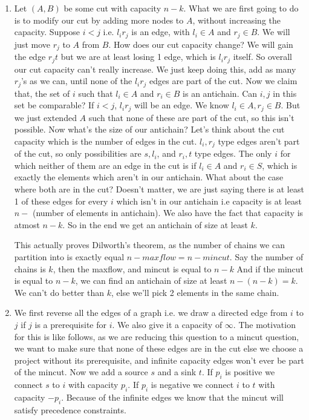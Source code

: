 \documentclass[12pt]{report}
\begin{document}
\begin{enumerate}[label=\textbf{\arabic*.}]
  \item Let $(A,B)$ be some cut with capacity $n-k$. What we are first going to do is to modify our cut by adding more nodes to $A$, without increasing the 
  capacity. Suppose $i < j$ i.e. $l_i r_j$ is an edge, with $l_i \in A$ and $r_j \in B$. We will just move $r_j$ to $A$ from $B$. How does our cut capacity 
  change? We will gain the edge $r_j t$ but we are at least losing 1 edge, which is $l_i r_j$ itself. So overall our cut capacity can't really increase.
  We just keep doing this, add as many $r_j$'s as we can, until none of the $l_i r_j$ edges are part of the cut. Now we claim that, the set of $i$ such that
  $l_i \in A$ and $r_i \in B$ is an antichain. Can $i,j$ in this set be comparable? If $i<j$, $l_i r_j$ will be an edge. 
  We know $l_i \in A, r_j \in B$. But we just extended $A$ such that none of these are part of the cut, so this isn't possible. Now what's the size of our
  antichain? Let's think about the cut capacity which is the number of edges in the cut. $l_i, r_j$ type edges aren't part of the cut, so only possibilities
  are $s, l_i$, and $r_i, t$ type edges. The only $i$ for which neither of them are an edge in the cut is if $l_i \in A$ and $r_i \in S$, which is exactly
  the elements which aren't in our antichain. What about the case where both are in the cut? Doesn't matter, we are just saying there is at least 1 of these 
  edges for every $i$ which isn't in our antichain i.e capacity is at least $n -$ (number of elements in antichain). We also have the fact that capacity is 
  atmost $n-k$. So in the end we get an antichain of size at least $k$.

  This actually proves Dilworth's theorem, as the number of chains we can partition into is exactly equal $n - maxflow = n - mincut$. 
  Say the number of chains is $k$, then the maxflow, and mincut is equal to $n-k$
  And if the mincut is equal to $n-k$, we can find an antichain of size at least $n - (n-k) = k$. We can't do better than $k$, else we'll pick 2 elements in
  the same chain.

  \item We first reverse all the edges of a graph i.e. we draw a directed edge from $i$ to $j$ if $j$ is a prerequisite for $i$. We also give it a capacity 
  of $\infty$. The motivation for this is like follows, as we are reducing this question to a mincut question, we want to make sure that none of these edges 
  are in the cut else we choose a project without its prerequisite, and infinite capacity edges won't ever be part of the mincut. Now we add a source $s$ and
  a sink $t$. If $p_i$ is positive we connect $s$ to $i$ with capacity $p_i$. If $p_i$ is negative we connect $i$ to $t$ with capacity $-p_i$. Because of 
  the infinite edges we know that the mincut will satisfy precedence constraints. 


\end{enumerate}
\end{document}
